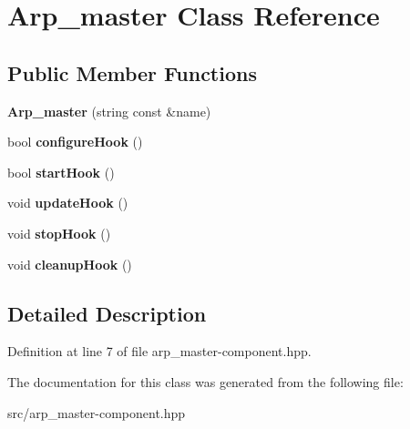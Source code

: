 \hypertarget{classArp__master}{
\section{Arp\_\-master Class Reference}
\label{classArp__master}
}
\subsection*{Public Member Functions}
\begin{DoxyCompactItemize}
\item 
\hypertarget{classArp__master_a7fd354e76b822b0d7e35a3e003de36f3}{
{\bfseries Arp\_\-master} (string const \&name)}
\label{classArp__master_a7fd354e76b822b0d7e35a3e003de36f3}

\item 
\hypertarget{classArp__master_aff08aa2b8a00b3d16f635207e826f9cf}{
bool {\bfseries configureHook} ()}
\label{classArp__master_aff08aa2b8a00b3d16f635207e826f9cf}

\item 
\hypertarget{classArp__master_a13caf0e7c06c15bb50e9e060ea781dd2}{
bool {\bfseries startHook} ()}
\label{classArp__master_a13caf0e7c06c15bb50e9e060ea781dd2}

\item 
\hypertarget{classArp__master_ae2b150e2d00c1f4b97a7d17264e4cbdd}{
void {\bfseries updateHook} ()}
\label{classArp__master_ae2b150e2d00c1f4b97a7d17264e4cbdd}

\item 
\hypertarget{classArp__master_a91be1024c63dc28c33221cbe9e1e1bf2}{
void {\bfseries stopHook} ()}
\label{classArp__master_a91be1024c63dc28c33221cbe9e1e1bf2}

\item 
\hypertarget{classArp__master_a3a7a9049c00aaf5cd0610100d4bba3d3}{
void {\bfseries cleanupHook} ()}
\label{classArp__master_a3a7a9049c00aaf5cd0610100d4bba3d3}

\end{DoxyCompactItemize}


\subsection{Detailed Description}


Definition at line 7 of file arp\_\-master-\/component.hpp.



The documentation for this class was generated from the following file:\begin{DoxyCompactItemize}
\item 
src/arp\_\-master-\/component.hpp\end{DoxyCompactItemize}
